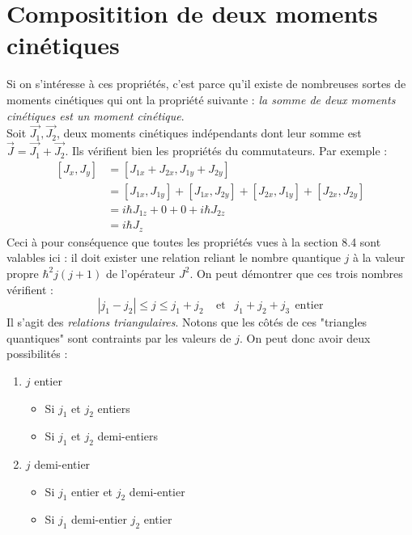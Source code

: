 \documentclass	[11pt, a4paper, openany]{book}
\begin{document}
	\section{Compositition de deux moments cinétiques}
	Si on s'intéresse à ces propriétés, c'est parce qu'il existe de nombreuses sortes
	de moments cinétiques qui ont la propriété suivante : \textit{la somme de deux 
	moments cinétiques est un moment cinétique}.\\
	Soit $\vec{J_1},\vec{J_2}$, deux moments cinétiques indépendants dont leur 
	somme est $\vec{J} = \vec{J_1}+\vec{J_2}$. Ils vérifient bien les propriétés
	du commutateurs. Par exemple :
	\begin{equation}
	\begin{array}{ll}
	[J_x,J_y] &= [J_{1x}+J_{2x},J_{1y}+J_{2y}]\\
	 &= \left[J_{1x},J_{1y}\right]+\left[J_{1x},J_{2y}\right]+\left[J_{2x},J_{1y}\right]
	 +\left[J_{2x},J_{2y}\right]\\
	 &= i\hbar J_{1z } + 0 + 0 + i\hbar J_{2z}\\
	 &= i\hbar J_{z}
	\end{array}
	\end{equation}
	Ceci à pour conséquence que toutes les propriétés vues à la section 8.4 sont 
	valables ici : il doit exister une relation reliant le nombre quantique $j$ à
	la valeur propre $\hbar^2j(j+1)$ de l'opérateur $J^2$. On peut démontrer que 
	ces trois nombres vérifient :
	\begin{equation}
	|j_1-j_2| \leq j \leq j_1+j_2\ \ \ \ \ \text{et }\ \ j_1+j_2+j_3\ \ \text{entier}
	\end{equation}
	Il s'agit des \textit{relations triangulaires}. Notons que les côtés de ces 
	"triangles quantiques" sont contraints par les valeurs de $j$. On peut donc 
	avoir deux possibilités :
	\begin{enumerate}
	\item $j$ entier
		\begin{itemize}
		\item Si $j_1$ et $j_2$ entiers
		\item Si $j_1$ et $j_2$ demi-entiers
		\end{itemize}
	\item $j$ demi-entier
		\begin{itemize}
		\item Si $j_1$ entier et $j_2$ demi-entier
		\item Si $j_1$ demi-entier $j_2$ entier
		\end{itemize}
	\end{enumerate}
	
\end{document}
